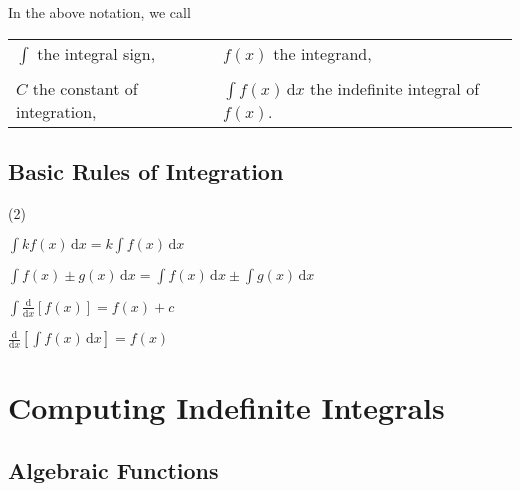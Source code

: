 \documentclass[11pt,a4paper]{book}
\begin{document}
In the above notation, we call

\begin{tabular}{ll}
${\displaystyle \int}$ \hspace{0.5cm}the integral sign, & \hspace{1cm}$f(x)$ \hspace{0.5cm}the integrand,\tabularnewline
 & \tabularnewline
$C$ \hspace{0.5cm}the constant of integration, & \hspace{1cm}${\displaystyle \int f(x)\, \mathrm{d}x}$\hspace{0.5cm}
the indefinite integral of $f(x)$.\tabularnewline
\end{tabular}

\subsection{Basic Rules of Integration}

\begin{tcolorbox}[colback=blue!5, colframe=black, boxrule=.4pt, sharpish corners]

\begin{tasks}[style=itemize,label-width=3.5ex,column-sep=-1cm](2)

\task  ${\displaystyle \int kf(x)\, \mathrm{d}x=k\int f(x)\, \mathrm{d}x}$

\task  ${\displaystyle \int f(x)\pm g(x)\, \mathrm{d}x=\int f(x)\, \mathrm{d}x\pm\int g(x)\, \mathrm{d}x}$

\task  ${\displaystyle \int\frac{\mathrm{d}}{\mathrm{d}x}\left[f\left(x\right)\right]=f\left(x\right)+c}$

\task  ${\displaystyle \frac{\mathrm{d}}{\mathrm{d}x}\left[\int f\left(x\right)\,\mathrm{d}x\right]=f\left(x\right)}$

\end{tasks}
\end{tcolorbox}

\newpage{}

\section{Computing Indefinite Integrals}

\subsection{Algebraic Functions}
\end{document}

